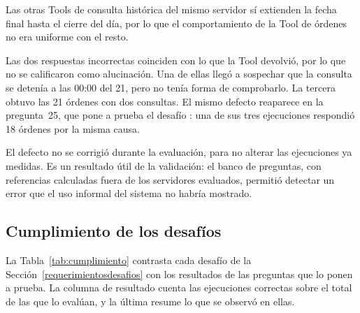 Las otras Tools de consulta histórica del mismo servidor sí extienden la fecha final hasta el cierre del día, por lo que el comportamiento de la Tool de órdenes no era uniforme con el resto.

Las dos respuestas incorrectas coinciden con lo que la Tool devolvió, por lo que no se calificaron como alucinación. Una de ellas llegó a sospechar que la consulta se detenía a las 00:00 del 21, pero no tenía forma de comprobarlo. La tercera obtuvo las 21 órdenes con dos consultas. El mismo defecto reaparece en la pregunta~25, que pone a prueba el desafío : una de sus tres ejecuciones respondió 18 órdenes por la misma causa.

El defecto no se corrigió durante la evaluación, para no alterar las ejecuciones ya medidas. Es un resultado útil de la validación: el banco de preguntas, con referencias calculadas fuera de los servidores evaluados, permitió detectar un error que el uso informal del sistema no habría mostrado.

\subsection{Cumplimiento de los desafíos}
\label{cumplimientorequerimientos}

La Tabla~\ref{tab:cumplimiento} contrasta cada desafío de la Sección~\ref{requerimientosdesafios} con los resultados de las preguntas que lo ponen a prueba. La columna de resultado cuenta las ejecuciones correctas sobre el total de las que lo evalúan, y la última resume lo que se observó en ellas.

